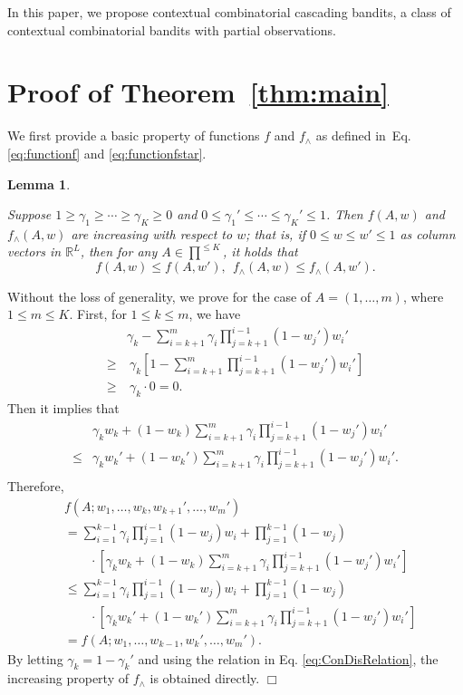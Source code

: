 \documentclass{article}
\newcommand{\RR}{\mathbb{R}}
\newtheorem{lemma}[theorem]{Lemma}%
\newenvironment{proof}{\noindent {\textbf{Proof. }}}{$\Box$ \medskip}
\newcommand{\CLemmaIncre}{
  Suppose $1 \geq \gamma_1 \geq \cdots \geq \gamma_K \geq 0$ and $0 \leq \gamma_1' \leq \cdots \leq \gamma_K' \leq 1$. Then $f(A, w)$ and $f_{\wedge}(A, w)$ are increasing with respect to $w$; that is, if $0 \leq w \leq w' \leq 1$ as column vectors in $\RR^L$, then for any $A \in \prod^{\leq K}$, it holds that
  $$
    f(A, w) \leq f(A, w'), ~~ f_{\wedge}(A, w) \leq f_{\wedge}(A, w').
  $$
}
\begin{document}
In this paper, we propose contextual combinatorial cascading bandits, a class of contextual combinatorial bandits with partial observations.


	



\appendix

\section{Proof of Theorem~\ref{thm:main}}

We first provide a basic property of functions $f$ and $f_{\wedge}$ as defined in~Eq.\eqref{eq:functionf} and \eqref{eq:functionfstar}.
\begin{lemma} %
  \label{lem:increasing} 
  \CLemmaIncre
\end{lemma}
\begin{proof}
  Without the loss of generality, we prove for the case of $A = (1, \ldots, m)$, where $1 \leq m \leq K$. First, for $1 \leq k \leq m$, we have
  \begin{align*}
  	&\gamma_{k} - \sum_{i=k+1}^m \gamma_i \prod_{j = k + 1}^{i - 1} (1 - w_j') w_i'\\
  	\geq &~\gamma_k [1 - \sum_{i=k+1}^m \prod_{j=k+1}^{i-1}(1 - w_j') w_i']\\
  	\geq &~\gamma_{k} \cdot 0 = 0.
  \end{align*}
  Then it implies that
  \begin{align*}
  	&\gamma_k w_k + (1 - w_k)\sum_{i=k+1}^m \gamma_i \prod_{j=k+1}^{i-1}(1 - w_j') w_i'\\
  	\leq &\gamma_k w_k' + (1 - w_k')\sum_{i=k+1}^m \gamma_i \prod_{j=k+1}^{i-1}(1 - w_j') w_i'.\\
  \end{align*}
  Therefore, 
  \begin{align*}
  	& f(A; w_1, \dots, w_k, w_{k+1}', \dots, w_m')\\
  	&=\sum_{i=1}^{k-1} \gamma_i \prod_{j=1}^{i-1}(1 - w_j) w_i + \prod_{j=1}^{k-1}(1 - w_j) \\
  	&\qquad \cdot [\gamma_k w_k + (1 - w_k)\sum_{i=k+1}^m \gamma_i \prod_{j=k+1}^{i-1}(1 - w_j') w_i']\\
  	&\leq \sum_{i=1}^{k-1} \gamma_i \prod_{j=1}^{i-1}(1 - w_j) w_i + \prod_{j=1}^{k-1}(1 - w_j) \\
  	&\qquad \cdot [\gamma_k w_k' + (1 - w_k')\sum_{i=k+1}^m \gamma_i \prod_{j=k+1}^{i-1}(1 - w_j') w_i']\\
  	&=f(A; w_1, \ldots, w_{k-1}, w_{k}', \ldots, w_m').
  \end{align*}
  By letting $\gamma_k = 1 - \gamma_k'$ and using the relation in Eq. \eqref{eq:ConDisRelation}, the increasing property of $f_{\wedge}$ is obtained directly.
\end{proof}
\end{document}

